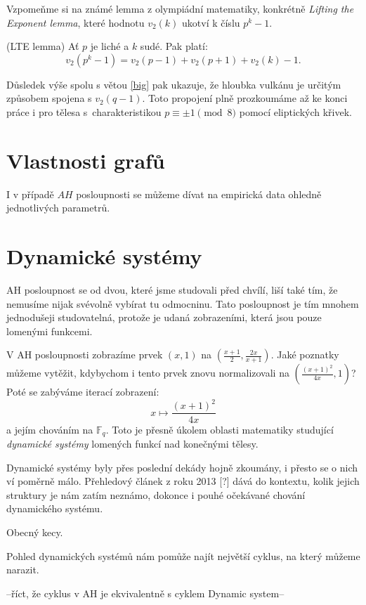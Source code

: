 \documentclass[12pt]{report}
\begin{document}
Vzpomeňme si na známé lemma z olympiádní matematiky, konkrétně \textit{Lifting the Exponent lemma}, které hodnotu $v_2(k)$ ukotví k číslu $p^k - 1$. 
\begin{veta}(LTE lemma)
Ať $p$ je liché a $k$ sudé. Pak platí:
$$v_2 (p^k - 1) = v_2(p-1)+v_2 (p+1) + v_2 (k) - 1.$$
\end{veta}
Důsledek výše spolu s větou \ref{big} pak ukazuje, že hloubka vulkánu je určitým způsobem spojena s $v_2 (q-1)$. Toto propojení plně prozkoumáme až ke konci práce i pro tělesa s~charakteristikou $p \equiv \pm 1 \pmod{8}$ pomocí eliptických křivek.

\section{Vlastnosti grafů}

I v případě $AH$ posloupnosti se můžeme dívat na empirická data ohledně jednotlivých parametrů.


\section{Dynamické systémy}

AH posloupnost se od dvou, které jsme studovali před chvílí, liší také tím, že nemusíme nijak svévolně vybírat tu  odmocninu. Tato posloupnost je tím mnohem jednodušeji studovatelná, protože je udaná zobrazeními, která jsou pouze lomenými funkcemi. 
  
V AH posloupnosti zobrazíme prvek $(x,1)$ na $\left(\frac{x+1}{2}, \frac{2x}{x+1}\right)$. Jaké poznatky můžeme vytěžit, kdybychom i tento prvek znovu normalizovali na $\left ( \frac{(x+1)^2}{4x}, 1 \right)$? Poté se zabýváme iterací zobrazení:
$$x \longmapsto \frac{(x+1)^2}{4x}$$
a jejím chováním na $\mathbb{F}_q$. Toto je přesně úkolem oblasti matematiky studující \textit{dynamické systémy} lomených funkcí nad konečnými tělesy.

Dynamické systémy byly přes poslední dekády hojně zkoumány, i přesto se o nich ví poměrně málo. Přehledový článek z roku 2013 [?] dává do kontextu, kolik jejich struktury je nám zatím neznámo, dokonce i pouhé očekávané chování dynamického systému. 




Obecný kecy.

Pohled dynamických systémů nám pomůže najít největší cyklus, na který můžeme narazit.

--říct, že cyklus v AH je ekvivalentně s cyklem Dynamic system--
\end{document}
